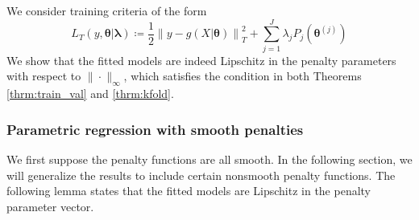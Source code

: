 \documentclass[12pt]{article}
\begin{document}
We consider training criteria of the form
\begin{equation}
\label{eq:param_add}
L_T \left (y, \boldsymbol{\theta} | \boldsymbol{\lambda} \right) 
\coloneqq \frac{1}{2} \left  \| y -  g(X| \boldsymbol{\theta}) \right \|^2_T 
+ \sum_{j=1}^J \lambda_j P_j(\boldsymbol{\theta}^{(j)})
\end{equation}
We show that the fitted models are indeed Lipschitz in the penalty parameters with respect to $\| \cdot \|_\infty$, which satisfies the condition in both Theorems \ref{thrm:train_val} and \ref{thrm:kfold}.


\subsubsection{Parametric regression with smooth penalties}
We first suppose the penalty functions are all smooth. In the following section, we will generalize the results to include certain nonsmooth penalty functions. The following lemma states that the fitted models are Lipschitz in the penalty parameter vector.
\end{document}
